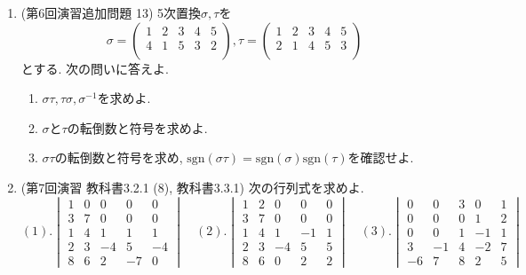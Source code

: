 \documentclass[dvipdfmx,a4paper,11pt]{article} %
\theoremstyle{definition}
\begin{document}
\begin{enumerate}[label=\textbf{問題}\arabic*.]
\item (第6回演習追加問題 13) 5次置換$ \sigma, \tau$を
 $$
 \sigma
 =
\begin{pmatrix}
1& 2& 3 & 4  & 5 \\
4& 1& 5& 3& 2 \\
\end{pmatrix}
, 
\tau 
 =
\begin{pmatrix}
1& 2& 3 & 4  & 5 \\
2& 1& 4& 5& 3 \\
\end{pmatrix}
$$
とする. 
次の問いに答えよ.
 \begin{enumerate}[label=(\arabic*)]
\item $\sigma \tau, \tau \sigma, \sigma^{-1}$を求めよ.
\item $\sigma$と$\tau$の転倒数と符号を求めよ. 
\item $\sigma \tau$の転倒数と符号を求め, $\mathrm{sgn}(\sigma \tau)=\mathrm{sgn}(\sigma) \mathrm{sgn}(\tau)$を確認せよ. 
\end{enumerate}


 \item (第7回演習 教科書3.2.1 (8), 教科書3.3.1) 
 次の行列式を求めよ.
\[
(1).
\begin{vmatrix}
1&0&0&0&0\\
3&7&0&0&0\\
1&4&1&1&1\\
2&3&-4&5&-4\\
8&6&2&-7&0
\end{vmatrix}
\quad
(2).
\begin{vmatrix}
1&2&0&0&0\\
3&7&0&0&0\\
1&4&1&-1&1\\
2&3&-4&5&5\\
8&6&0&2&2
\end{vmatrix}
\quad
(3).
\begin{vmatrix}
0&0&3&0&1\\
0&0&0&1&2\\
0&0&1&-1&1\\
3&-1&4&-2&7\\
-6&7&8&2&5
\end{vmatrix}
\]




\end{enumerate}
\end{document}
